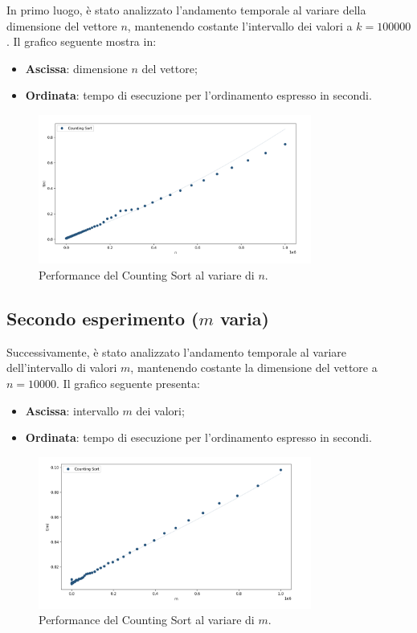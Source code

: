 \documentclass[a4paper, 12pt, oneside]{book}
\begin{document}
\noindent
In primo luogo, è stato analizzato l'andamento temporale al variare della dimensione del vettore \(n\), mantenendo costante l'intervallo dei valori a \(k = 100000\). 
Il grafico seguente mostra in:
\begin{itemize}
    \item \textbf{Ascissa}: dimensione \(n\) del vettore;
    \item \textbf{Ordinata}: tempo di esecuzione per l'ordinamento espresso in secondi.
\end{itemize}

\begin{figure}[H]
    \centering
    \includegraphics[width=0.8\textwidth]{images/grafico_counting_sort_n.png}
    \caption{Performance del Counting Sort al variare di \(n\).}
    \label{fig:counting_sort_n}
\end{figure}

\subsection{Secondo esperimento ($m$ varia)}

\noindent Successivamente, è stato analizzato l'andamento temporale al variare dell'intervallo di valori \(m\), mantenendo costante la dimensione del vettore a \(n = 10000\). 
Il grafico seguente presenta:
\begin{itemize}
    \item \textbf{Ascissa}: intervallo \(m\) dei valori;
    \item \textbf{Ordinata}: tempo di esecuzione per l'ordinamento espresso in secondi.
\end{itemize}

\begin{figure}[H]
    \centering
    \includegraphics[width=0.8\textwidth]{images/grafico_counting_sort_m.png}
    \caption{Performance del Counting Sort al variare di \(m\).}
    \label{fig:counting_sort_m}
\end{figure}
\end{document}
